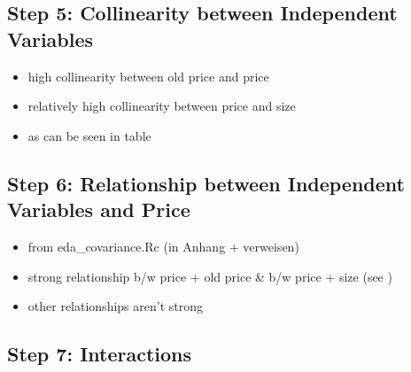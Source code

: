\documentclass[a4paper, nobind]{templates/ociamthesis}
\providecommand{\tightlist}{%
  \setlength{\itemsep}{0pt}\setlength{\parskip}{0pt}}
\begin{document}
\hypertarget{collinearity}{%
\subsection{Step 5: Collinearity between Independent Variables}\label{collinearity}}

\begin{itemize}
\tightlist
\item
  high collinearity between old price and price
\item
  relatively high collinearity between price and size
\item
  as can be seen in table
\end{itemize}

\hypertarget{relationship}{%
\subsection{Step 6: Relationship between Independent Variables and Price}\label{relationship}}

\begin{itemize}
\tightlist
\item
  from eda\_covariance.Rc (in Anhang + verweisen)
\item
  strong relationship b/w price + old price \& b/w price + size (see )
\item
  other relationships aren't strong
\end{itemize}

\hypertarget{step-7-interactions}{%
\subsection{Step 7: Interactions}\label{step-7-interactions}}
\end{document}
